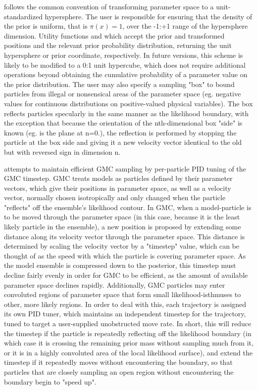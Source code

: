  follows the common convention of transforming parameter space to a unit-standardized hypersphere. The user is responsible for ensuring that the density of the prior is uniform, that is $\pi(x) = 1$, over the -1:+1 range of the hypersphere dimension. Utility functions  and  which accept the prior and transformed positions and the relevant prior probability distribution, returning the unit hypersphere or prior coordinate, respectively. In future versions, this scheme is likely to be modified to a 0:1 unit hypercube, which does not require additional operations beyond obtaining the cumulative probability of a parameter value on the prior distribution. The user may also specify a sampling "box" to bound particles from illegal or nonsensical areas of the parameter space (eg. negative values for continuous distributions on positive-valued physical variables). The box reflects particles specularly in the same manner as the likelihood boundary, with the exception that because the orientation of the nth-dimensional box "side" is known (eg. is the plane at n=0.), the reflection is performed by stopping the particle at the box side and giving it a new velocity vector identical to the old but with reversed sign in dimension n. 

 attempts to maintain efficient GMC sampling by per-particle PID tuning of the GMC timestep. GMC treats models as particles defined by their parameter vectors, which give their positions in parameter space, as well as a velocity vector, normally chosen isotropically and only changed when the particle "reflects" off the ensemble's likelihood contour. In GMC, when a model-particle is to be moved through the parameter space (in this case, because it is the least likely particle in the ensemble), a new position is proposed by extending some distance along its velocity vector through the parameter space. This distance is determined by scaling the velocity vector by a "timestep" value, which can be thought of as the speed with which the particle is covering parameter space. As the model ensemble is compressed down to the posterior, this timestep must decline fairly evenly in order for GMC to be efficient, as the amount of available parameter space declines rapidly. Additionally, GMC particles may enter convoluted regions of parameter space that form small likelihood-isthmuses to other, more likely regions. In order to deal with this, each trajectory is assigned its own PID tuner, which maintains an independent timestep for the trajectory, tuned to target a user-supplied unobstructed move rate. In short, this will reduce the timestep if the particle is repeatedly reflecting off the likelihood boundary (in which case it is crossing the remaining prior mass without sampling much from it, or it is in a highly convoluted area of the local likelihood surface), and extend the timestep if it repeatedly moves without encountering the boundary, so that particles that are closely sampling an open region without encountering the boundary begin to "speed up".

